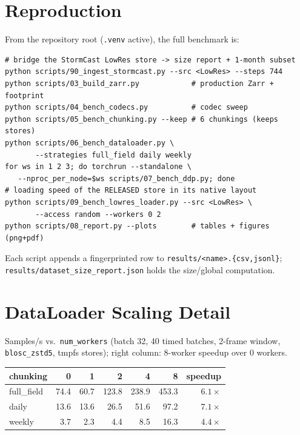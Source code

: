 \documentclass[conference]{IEEEtran}
\begin{document}
\section{Reproduction}
From the repository root (\texttt{.venv} active), the full benchmark is:
\begin{lstlisting}
# bridge the StormCast LowRes store -> size report + 1-month subset
python scripts/90_ingest_stormcast.py --src <LowRes> --steps 744
python scripts/03_build_zarr.py            # production Zarr + footprint
python scripts/04_bench_codecs.py          # codec sweep
python scripts/05_bench_chunking.py --keep # 6 chunkings (keeps stores)
python scripts/06_bench_dataloader.py \
       --strategies full_field daily weekly
for ws in 1 2 3; do torchrun --standalone \
   --nproc_per_node=$ws scripts/07_bench_ddp.py; done
# loading speed of the RELEASED store in its native layout
python scripts/09_bench_lowres_loader.py --src <LowRes> \
       --access random --workers 0 2
python scripts/08_report.py --plots        # tables + figures (png+pdf)
\end{lstlisting}
Each script appends a fingerprinted row to \texttt{results/<name>.\{csv,jsonl\}};
\texttt{results/dataset\_size\_report.json} holds the size/global computation.

\section{DataLoader Scaling Detail}\label{app:dl}
Samples/s vs.\ \texttt{num\_workers} (batch 32, 40 timed batches, 2-frame
window, \texttt{blosc\_zstd5}, tmpfs stores); right column: 8-worker speedup
over 0 workers.
\begin{center}\small
\begin{tabular}{@{}lrrrrrr@{}}
\toprule
chunking & 0 & 1 & 2 & 4 & 8 & speedup \\
\midrule
full\_field & 74.4 & 60.7 & 123.8 & 238.9 & 453.3 & $6.1\times$ \\
daily       & 13.6 & 13.6 & 26.5  & 51.6  & 97.2  & $7.1\times$ \\
weekly      & 3.7  & 2.3  & 4.4   & 8.5   & 16.3  & $4.4\times$ \\
\bottomrule
\end{tabular}
\end{center}
\end{document}
